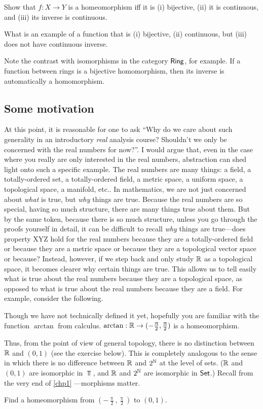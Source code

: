 \begin{exr}
Show that $f:X\rightarrow Y$ is a homeomorphism iff it is (i) bijective, (ii) it is continuous, and (iii) its inverse is continuous.
\end{exr}
\begin{exr}
What is an example of a function that is (i) bijective, (ii) continuous, but (iii) does not have continuous inverse.
\begin{rmk}
Note the contrast with isomorphisms in the category $\mathsf{Ring}$, for example.  If a function between rings is a bijective homomorphism, then its inverse is automatically a homomorphism.
\end{rmk}
\end{exr}

\subsection{Some motivation}

At this point, it is reasonable for one to ask ``Why do we care about such generality in an introductory \emph{real} analysis course?  Shouldn't we only be concerned with the real numbers for now?''.  I would argue that, even in the case where you really are only interested in the real numbers, abstraction can shed light onto such a specific example.  The real numbers are many things:  a field, a totally-ordered set, a totally-ordered field, a metric space, a uniform space, a topological space, a manifold, etc..  In mathematics, we are not just concerned about \emph{what} is true, but \emph{why} things are true.  Because the real numbers are so special, having so much structure, there are many things true about them.  But by the same token, because there is so much structure, unless you go through the proofs yourself in detail, it can be difficult to recall \emph{why} things are true---does property XYZ hold for the real numbers because they are a totally-ordered field or because they are a metric space or because they are a topological vector space or because\textellipsis ?  Instead, however, if we step back and only study $\mathbb{R}$ as a topological space, it becomes clearer why certain things are true.  This allows us to tell easily what is true about the real numbers because they are a topological space, as opposed to what is true about the real numbers because they are a field.    For example, consider the following.
\begin{exm}
Though we have not technically defined it yet, hopefully you are familiar with the function $\arctan$ from calculus.  $\arctan :\mathbb{R} \rightarrow (-\frac{\uppi}{2},\frac{\uppi}{2})$ is a homeomorphism.
\end{exm}
Thus, from the point of view of general topology, there is no distinction between $\mathbb{R}$ and $(0,1)$ (see the exercise below).  This is completely analogous to the sense in which there is no difference between $\mathbb{R}$ and $2^{\mathbb{N}}$ at the level of sets.  ($\mathbb{R}$ and $(0,1)$ are isomorphic in $\Top$, and $\mathbb{R}$ and $2^{\mathbb{N}}$ are isomorphic in $\mathsf{Set}$.)  Recall from the very end of \cref{chp1} ---morphisms matter.
\begin{exr}
Find a homeomorphism from $(-\frac{\uppi}{2},\frac{\uppi}{2})$ to $(0,1)$.
\end{exr}

